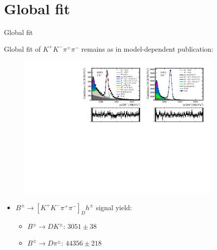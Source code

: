 \documentclass{beamer}
\begin{document}
\section{Global fit}
\begin{frame}{Global fit}
  \begin{center}
    {\large Global fit of $K^+K^-\pi^+\pi^-$ remains as in model-dependent publication:}
  \end{center}
  \begin{figure}
    \centering
    \includegraphics[width = 0.9\textwidth,trim={0 0 0 0},clip=true]{Plots/d2kkpipi_fiveL_allDP.pdf}
  \end{figure}
  \vspace{-0.5cm}
  \begin{itemize}
    \item{$B^\pm\to[K^+K^-\pi^+\pi^-]_Dh^\pm$ signal yield:}
    \begin{itemize}
      \item{$B^\pm\to DK^\pm$: $3051 \pm 38$}
      \item{$B^\pm\to D\pi^\pm$: $44356 \pm 218$}
    \end{itemize}
  \end{itemize}
\end{frame}
\end{document}
